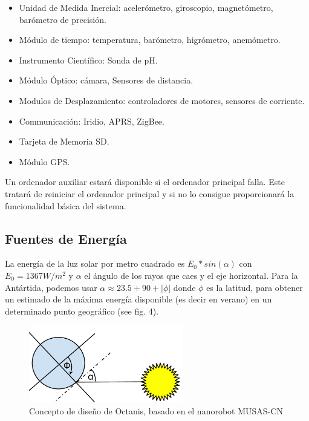 \documentclass[a4paper,12pt]{article}
\begin{document}
\begin{itemize}
\item Unidad de Medida Inercial: acelerómetro, giroscopio, magnetómetro, barómetro de precisión.
\item Módulo de tiempo: temperatura, barómetro, higrómetro, anemómetro.
\item Instrumento Científico: Sonda de pH.
\item Módulo Óptico: cámara, Sensores de distancia.
\item Modulos de Desplazamiento: controladores de motores, sensores de corriente.
\item Communicación: Iridio, APRS, ZigBee.
\item Tarjeta de Memoria SD.
\item Módulo GPS.
\end{itemize}

Un ordenador auxiliar estará disponible si el ordenador principal falla. Este tratará de reiniciar el ordenador principal y si no lo consigue proporcionará la funcionalidad básica del sistema.



\subsection{Fuentes de Energía}

La energía de la luz solar por metro cuadrado es $E_0*sin(\alpha)$ con $E_0=1367 W/m^2$ \cite{solarc} y $\alpha$  el ángulo de los rayos que caes y el eje horizontal. Para la Antártida, podemos usar $\alpha \approx 23.5+90+|\phi|$ donde $\phi$ es la latitud, para obtener un estimado de la máxima energía disponible (es decir en verano) en un determinado punto geográfico (see fig. 4).


\begin{figure}[h!]
	\centering
    \includegraphics[width=0.6\textwidth]{sun}
    \caption{Concepto de diseño de Octanis, basado en el nanorobot MUSAS-CN}
\end{figure}
\end{document}
